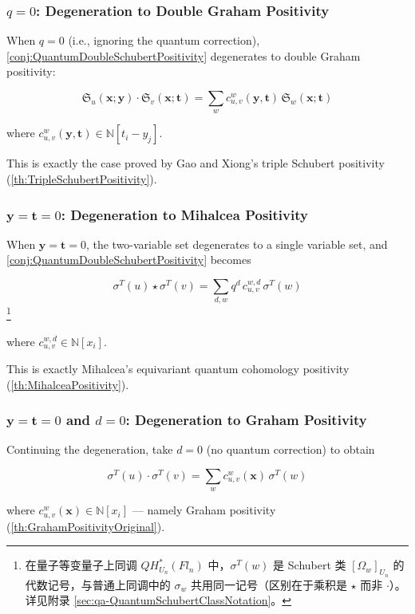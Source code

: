 \subsubsection{$q = 0$: Degeneration to Double Graham Positivity}

When $q = 0$ (i.e., ignoring the quantum correction), \cref{conj:QuantumDoubleSchubertPositivity} degenerates to double Graham positivity:

$$\mathfrak{S}_u(\mathbf{x}; \mathbf{y}) \cdot \mathfrak{S}_v(\mathbf{x}; \mathbf{t}) = \sum_w c_{u,v}^w(\mathbf{y}, \mathbf{t}) \, \mathfrak{S}_w(\mathbf{x}; \mathbf{t})$$

where $c_{u,v}^w(\mathbf{y}, \mathbf{t}) \in \mathbb{N}[t_i - y_j]$.

This is exactly the case proved by Gao and Xiong's triple Schubert positivity (\cref{th:TripleSchubertPositivity}).

\subsubsection{$\mathbf{y} = \mathbf{t} = 0$: Degeneration to Mihalcea Positivity}

When $\mathbf{y} = \mathbf{t} = 0$, the two-variable set degenerates to a single variable set, and \cref{conj:QuantumDoubleSchubertPositivity} becomes

$$\sigma^T(u) \star \sigma^T(v) = \sum_{d,w} q^d \, c_{u,v}^{w,d} \, \sigma^T(w)$$\footnote{在量子等变量子上同调 $QH_{U_n}^*(Fl_n)$ 中，$\sigma^T(w)$ 是 Schubert 类 $[\Omega_w]_{U_n}$ 的代数记号，与普通上同调中的 $\sigma_w$ 共用同一记号（区别在于乘积是 $\star$ 而非 $\cdot$）。详见附录 \cref{sec:qa-QuantumSchubertClassNotation}。}

where $c_{u,v}^{w,d} \in \mathbb{N}[x_i]$.

This is exactly Mihalcea's equivariant quantum cohomology positivity (\cref{th:MihalceaPositivity}).

\subsubsection{$\mathbf{y} = \mathbf{t} = 0$ and $d = 0$: Degeneration to Graham Positivity}

Continuing the degeneration, take $d = 0$ (no quantum correction) to obtain

$$\sigma^T(u) \cdot \sigma^T(v) = \sum_w c_{u,v}^w(\mathbf{x}) \, \sigma^T(w)$$

where $c_{u,v}^w(\mathbf{x}) \in \mathbb{N}[x_i]$ --- namely Graham positivity (\cref{th:GrahamPositivityOriginal}).

